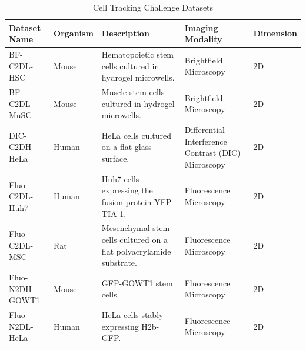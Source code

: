 \documentclass[./dissertation.tex]{subfiles}
\begin{document}
\begin{table}[ht]
    \centering
    \caption{Cell Tracking Challenge Datasets}
    \label{tbl:ctc_datasets}
    \renewcommand{\arraystretch}{1.3} %
    \small %
    \begin{tabular}{|l|p{2cm}|p{5cm}|p{2cm}|p{2cm}|}
        \hline
        \textbf{Dataset Name} & \textbf{Organism}       & \textbf{Description}                                                                                                        & \textbf{Imaging Modality}                           & \textbf{Dimension} \\ \hline
        BF-C2DL-HSC           & Mouse                   & Hematopoietic stem cells cultured in hydrogel microwells.                                                                   & Brightfield Microscopy                              & 2D                 \\ \hline
        BF-C2DL-MuSC          & Mouse                   & Muscle stem cells cultured in hydrogel microwells.                                                                          & Brightfield Microscopy                              & 2D                 \\ \hline
        DIC-C2DH-HeLa         & Human                   & HeLa cells cultured on a flat glass surface.                                                                                & Differential Interference Contrast (DIC) Microscopy & 2D                 \\ \hline
        Fluo-C2DL-Huh7        & Human                   & Huh7 cells expressing the fusion protein YFP-TIA-1.                                                                         & Fluorescence Microscopy                             & 2D                 \\ \hline
        Fluo-C2DL-MSC         & Rat                     & Mesenchymal stem cells cultured on a flat polyacrylamide substrate.                                                         & Fluorescence Microscopy                             & 2D                 \\ \hline
        Fluo-N2DH-GOWT1       & Mouse                   & GFP-GOWT1 stem cells.                                                                                                       & Fluorescence Microscopy                             & 2D                 \\ \hline
        Fluo-N2DL-HeLa        & Human                   & HeLa cells stably expressing H2b-GFP.                                                                                       & Fluorescence Microscopy                             & 2D                 \\ \hline

\end{tabular}
\end{table}
\end{document}
